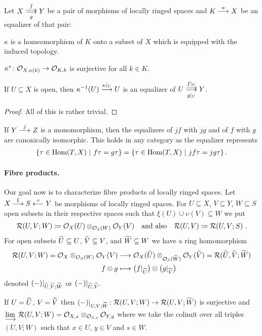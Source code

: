 \documentclass[a4paper,parskip=half,numbers=enddot, DIV=12]{scrreprt}
\begin{document}
\begin{cor}
    Let $X\doublemorphism[f][\smash{g}] Y$ be a pair of morphisms of locally ringed spaces and $K\morphism[\kappa] X$ be an equalizer of that pair:
    \begin{alphanumerate}
      \item 
        $\kappa$ is a homeomorphism of $K$ onto a subset of $X$ which is equipped with the induced topology.
      \item 
        $\kappa^*\colon \Oo_{X,\kappa(k)} \morphism \Oo_{K,k}$ is surjective for all $k\in K$.
      \item 
        If $U\subseteq X$ is open, then $\kappa^{-1} (U) \morphism[\kappa|_U] U$ is an equalizer of $U \doublemorphism[f|_U][g|_U] Y$.
    \end{alphanumerate}
\end{cor}
\begin{proof}
	All of this is rather trivial.
\end{proof}
\begin{rem*}
    If $Y\morphism[j] Z$ is a monomorphism, then the equalizers of $jf$ with $jg$ and of $f$ with $g$ are canonically isomorphic. This holds in any category as the equalizer represents
    \begin{align*}
        \left\{\tau \in \operatorname{Hom}(T,X) \ \middle|\   f\tau =  g\tau \right\} = \left\{\tau \in \operatorname{Hom}(T,X) \ \middle|\  jf\tau = jg\tau\right\}.
    \end{align*}
\end{rem*}
\paragraph{Fibre products.} Our goal now is to characterize fibre products of locally ringed spaces. Let $X\morphism[\xi]S\lmorphism[\upsilon]Y$ be morphisms of locally ringed spaces.  For $U\subseteq X$, $V\subseteq Y$, $W\subseteq S$ open subsets in their respective spaces such that $\xi(U) \cup \upsilon(V)\subseteq W$ we put 
\begin{align*}
	\mathcal{R}(U,V;W) \coloneqq \mathcal{O}_X(U)\otimes_{\mathcal{O}_S(W)}\mathcal{O}_Y(V)\quad\text{and also}\quad \mathcal{R}(U,V) \coloneqq  \mathcal{R}(U,V;S)\;. 
\end{align*}
For open subsets $\snake{U}\subseteq U$, $\snake{V}\subseteq V$, and  $\snake{W}\subseteq W$ we have a ring homomorphism
\begin{align*}
	\Rr(U,V;W)=\Oo_X\otimes_{\Oo_S(W)}\Oo_Y(V)&\morphism\Oo_X(\snake{U})\otimes_{\Oo_S(\snake{W})}\Oo_Y(\snake{V})=\Rr(\snake{U},\snake{V};\snake{W})\\
	f\otimes g&\longmapsto \big(f|_{\snake{U}}\big)\otimes\big(g|_{\snake{V}}\big)
\end{align*}
denoted $(-)|_{\snake{U},\snake{V};\snake{W}}$ or $(-)|_{\snake{U},\snake{V}}$.
\begin{rem*}
	If $U=\snake U$, $V= \snake V$ then $(-)|_{U,V;\snake W}\colon\Rr(U,V;W)\morphism \Rr(U,V;\snake{W})$ is surjective and $\colimit \Rr(U,V;W) = \Oo_{X,x}\otimes_{\Oo_{S,s}} \Oo_{Y,y}$ where we take the colimit over all triples $(U,V;W)$ such that $x\in U$, $y\in V$ and $s\in W$.
\end{rem*}
\end{document}
